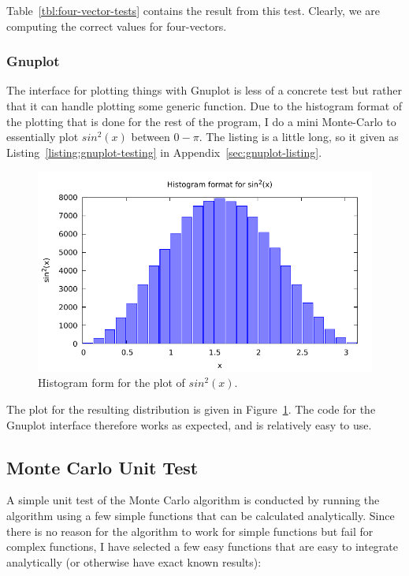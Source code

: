 Table~\ref{tbl:four-vector-tests} contains the result from this test. Clearly, we are computing the correct values for four-vectors.

\subsubsection{Gnuplot}

The interface for plotting things with Gnuplot is less of a concrete test but rather that it can handle plotting some generic function. Due to the histogram format of the plotting that is done for the rest of the program, I do a mini Monte-Carlo to essentially plot $sin^2(x)$ between $0-\pi$. The listing is a little long, so it given as Listing~\ref{listing:gnuplot-testing} in Appendix~\ref{sec:gnuplot-listing}.

\begin{figure}[ht]
  \centering
  \includegraphics[width=0.75\linewidth]{./res/gfx/sin2_x.pdf}
  \caption{Histogram form for the plot of $sin^2(x)$.}
  \label{fig:sin2x}
\end{figure}

The plot for the resulting distribution is given in Figure~\ref{fig:sin2x}. The code for the Gnuplot interface therefore works as expected, and is relatively easy to use.





\subsection{Monte Carlo Unit Test}

A simple unit test of the Monte Carlo algorithm is conducted by running the algorithm using a few simple functions that can be calculated analytically. Since there is no reason for the algorithm to work for simple functions but fail for complex functions, I have selected a few easy functions that are easy to integrate analytically (or otherwise have exact known results):

